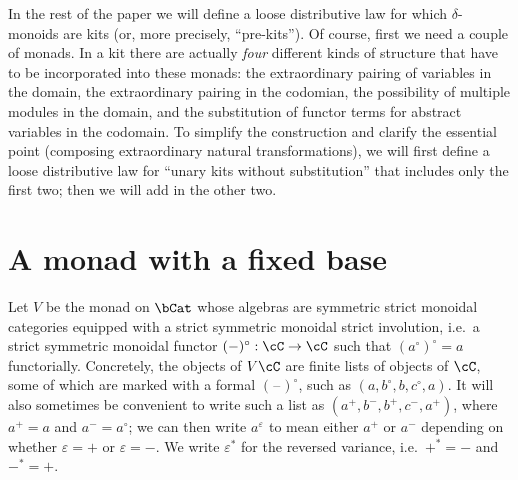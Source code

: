 \documentclass{amsart}
\newcommand{\C}{\cC}
\newcommand{\dl}{\delta}
\newcommand{\blank}{\mathord{\hspace{1pt}\text{--}\hspace{1pt}}}
\renewcommand{\o}{^{\circ}}
\newcommand{\p}{^{+}}
\newcommand{\m}{^{-}}
\newcommand{\e}[1][]{^{\varepsilon_{#1}}}
\begin{document}
In the rest of the paper we will define a loose distributive law for which $\dl$-monoids are kits (or, more precisely, ``pre-kits'').
Of course, first we need a couple of monads.
In a kit there are actually \emph{four} different kinds of structure that have to be incorporated into these monads: the extraordinary pairing of variables in the domain, the extraordinary pairing in the codomian, the possibility of multiple modules in the domain, and the substitution of functor terms for abstract variables in the codomain.
To simplify the construction and clarify the essential point (composing extraordinary natural transformations), we will first define a loose distributive law for ``unary kits without substitution'' that includes only the first two; then we will add in the other two.

\section{A monad with a fixed base}
\label{sec:monad-cat}

Let $V$ be the monad on $\bCat$ whose algebras are symmetric strict monoidal categories equipped with a strict symmetric monoidal strict involution, i.e.\ a strict symmetric monoidal functor $(-)\o : \C\to\C$ such that $(a\o)\o =a$ functorially.
Concretely, the objects of $V\C$ are finite lists of objects of $\C$, some of which are marked with a formal $(\blank)\o$, such as $(a,b\o,b,c\o,a)$.
It will also sometimes be convenient to write such a list as $(a\p,b\m,b\p,c\m,a\p)$, where $a\p=a$ and $a\m=a\o$; we can then write $a\e$ to mean either $a\p$ or $a\m$ depending on whether $\varepsilon=+$ or $\varepsilon=-$.
We write $\varepsilon^*$ for the reversed variance, i.e.\ $+^*=-$ and $-^*=+$.
\end{document}

